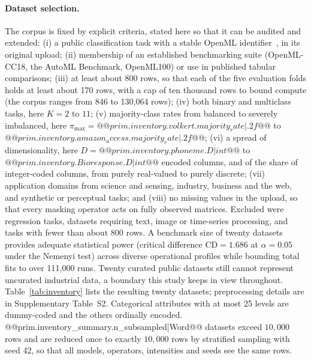 \documentclass[pdflatex,sn-mathphys]{sn-jnl}
\theoremstyle{thmstyleone}
\theoremstyle{thmstyletwo}
\theoremstyle{thmstylethree}
\begin{document}
\paragraph{Dataset selection.} The corpus is fixed by explicit criteria, stated here so that it can be audited and extended: (i) a public classification task with a stable OpenML identifier~\cite{bischl2021openml}, in its original upload; (ii) membership of an established benchmarking suite (OpenML-CC18, the AutoML Benchmark, OpenML100) or use in published tabular comparisons; (iii) at least about 800 rows, so that each of the five evaluation folds holds at least about 170 rows, with a cap of ten thousand rows to bound compute (the corpus ranges from 846 to 130{,}064 rows); (iv) both binary and multiclass tasks, here $K=2$ to $11$; (v) majority-class rates from balanced to severely imbalanced, here $\pi_{\max}=@@{prim.inventory.volkert.majority_rate|.2f}@@$ to $@@{prim.inventory.amazon_access.majority_rate|.2f}@@$; (vi) a spread of dimensionality, here $D=@@{prim.inventory.phoneme.D|int}@@$ to $@@{prim.inventory.Bioresponse.D|int}@@$ encoded columns, and of the share of integer-coded columns, from purely real-valued to purely discrete; (vii) application domains from science and sensing, industry, business and the web, and synthetic or perceptual tasks; and (viii) no missing values in the upload, so that every masking operator acts on fully observed matrices. Excluded were regression tasks, datasets requiring text, image or time-series processing, and tasks with fewer than about 800 rows. A benchmark size of twenty datasets provides adequate statistical power (critical difference $\mathrm{CD}=1.686$ at $\alpha=0.05$ under the Nemenyi test) across diverse operational profiles while bounding total fits to over 111{,}000 runs. Twenty curated public datasets still cannot represent uncurated industrial data, a boundary this study keeps in view throughout. Table~\ref{tab:inventory} lists the resulting twenty datasets; preprocessing details are in Supplementary Table~S2. Categorical attributes with at most 25 levels are dummy-coded and the others ordinally encoded. @@{prim.inventory_summary.n_subsampled|Word}@@ datasets exceed $10{,}000$ rows and are reduced once to exactly $10{,}000$ rows by stratified sampling with seed 42, so that all models, operators, intensities and seeds see the same rows.


\end{document}
